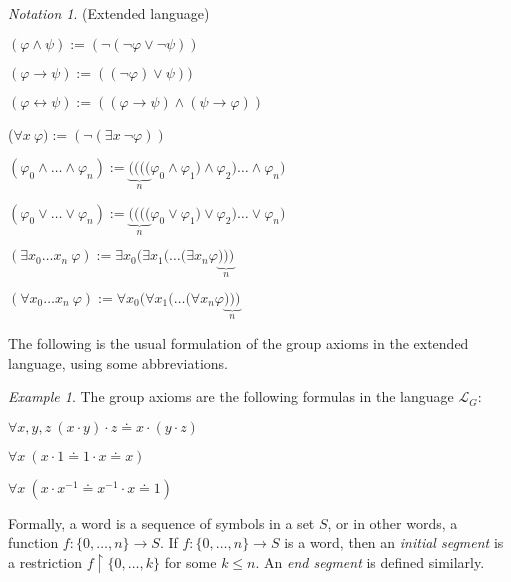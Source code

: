\documentclass[a4paper, 11pt]{amsart}
\theoremstyle{remark}
\newtheorem{notation}[theorem]{Notation}
\newtheorem{example}[example]{Example}
\newcommand{\cL}{\mathcal L}
\newenvironment{enumerate-(1)}{\begin{enumerate}[label={\upshape (\arabic*)}, leftmargin=2pc]}{\end{enumerate}}
\begin{document}
\begin{notation}(Extended language) \
\begin{enumerate-(1)} 
\item 
$(\varphi \wedge \psi) := (\neg (\neg \varphi \vee \neg \psi))$ 
\item 
$(\varphi \rightarrow \psi) := ((\neg \varphi) \vee \psi))$ 
\item 
$(\varphi \leftrightarrow \psi) := ((\varphi \rightarrow \psi) \wedge (\psi \rightarrow \varphi))$ 
\item 
($\forall x\ \varphi) := (\neg (\exists x \ \neg \varphi))$ 
\item 
$(\varphi_0\wedge \dots \wedge \varphi_n) := \underbrace{((((}_{n}\varphi_0\wedge \varphi_1)\wedge \varphi_2) \dots \wedge\varphi_n )$ 
\item 
$(\varphi_0\vee \dots \vee \varphi_n) := \underbrace{((((}_{n}\varphi_0\vee \varphi_1)\vee \varphi_2) \dots \vee\varphi_n )$ 
\item 
$(\exists x_0 \dots x_n\ \varphi) := \exists x_0 ( \exists x_1( \dots (\exists x_n \varphi\underbrace{)))}_{n}$ 
\item 
$(\forall x_0 \dots x_n\ \varphi) := \forall x_0 ( \forall x_1( \dots (\forall x_n \varphi\underbrace{)))}_{n}$ 
\end{enumerate-(1)} 
\end{notation}

The following is the usual formulation of the group axioms in the extended language, using some abbreviations. 

\begin{example} 
The group axioms are the following formulas in the language $\cL_G$: 
\begin{enumerate-(1)} 
\item 
$\forall x,y,z\ (x\cdot y) \cdot z \doteq x \cdot (y\cdot z)$ 
\item 
$\forall x\ (x\cdot 1 \doteq 1 \cdot x \doteq x)$ 
\item 
$\forall x\ (x\cdot x^{-1} \doteq x^{-1} \cdot x \doteq 1)$  
\end{enumerate-(1)} 
\end{example} 

Formally, a word is a sequence of symbols in a set $S$, or in other words, a function $f\colon \{0,\dots,n\}\rightarrow S$. 
If $f\colon \{0,\dots,n\}\rightarrow S$ is a word, then an \emph{initial segment} is a restriction $f{\upharpoonright}\{0,\dots,k\}$ for some $k\leq n$. An \emph{end segment} is defined similarly. 
\end{document}
